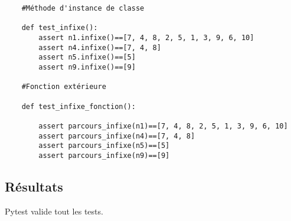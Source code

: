 \documentclass{article}
\begin{document}
\renewcommand{\theFancyVerbLine}{
  \sffamily\textcolor[rgb]{0.5,0.5,0.5}{\scriptsize\arabic{FancyVerbLine}}}

\begin{verbatim}
    #Méthode d'instance de classe

    def test_infixe():
        assert n1.infixe()==[7, 4, 8, 2, 5, 1, 3, 9, 6, 10]
        assert n4.infixe()==[7, 4, 8]
        assert n5.infixe()==[5]
        assert n9.infixe()==[9]

    #Fonction extérieure

    def test_infixe_fonction():
    
        assert parcours_infixe(n1)==[7, 4, 8, 2, 5, 1, 3, 9, 6, 10]
        assert parcours_infixe(n4)==[7, 4, 8]
        assert parcours_infixe(n5)==[5]
        assert parcours_infixe(n9)==[9]
\end{verbatim}
\subsection{Résultats}
Pytest valide tout les tests.
\end{document}
